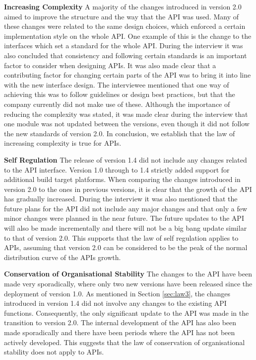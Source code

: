 \documentclass{sig-alternate}
\begin{document}
\smallskip \noindent
\textbf{Increasing Complexity  } \label{sec:law2} 
A majority of the changes introduced in version 2.0 aimed to improve the structure and the way that the API was used. Many of these changes were related to the same design choices, which enforced a certain implementation style on the whole API. One example of this is the change to the interfaces which set a standard for the whole API. During the interview it was also concluded that consistency and following certain standards is an important factor to consider when designing APIs. It was also made clear that a contributing factor for changing certain parts of the API was to bring it into line with the new interface design. The interviewee mentioned that one way of achieving this was to follow guidelines or design best practices, but that the company currently did not make use of these. Although the importance of reducing the complexity was stated, it was made clear during the interview that one module was not updated between the versions, even though it did not follow the new standards of version 2.0. In conclusion, we establish that the law of increasing complexity is true for APIs. 

\smallskip \noindent
\textbf{Self Regulation  } \label{sec:law3} 
The release of version 1.4 did not include any changes related to the API interface. Version 1.0 through to 1.4 strictly added support for additional build target platforms. When comparing the changes introduced in version 2.0 to the ones in previous versions, it is clear that the growth of the API has gradually increased. During the interview it was also mentioned that the future plans for the API did not include any major changes and that only a few minor changes were planned in the near future. The future updates to the API will also be made incrementally and there will not be a big bang update similar to that of version 2.0. This supports that the law of self regulation applies to APIs, assuming that version 2.0 can be considered to be the peak of the normal distribution curve of the APIs growth. 

\smallskip \noindent
\textbf{Conservation of Organisational Stability  } 
The changes to the API have been made very sporadically, where only two new versions have been released since the deployment of version 1.0. As mentioned in Section \ref{sec:law3}, the changes introduced in version 1.4 did not involve any changes to the existing API functions. Consequently, the only significant update to the API was made in the transition to version 2.0. The internal development of the API has also been made sporadically and there have been periods where the API has not been actively developed. This suggests that the law of conservation of organisational stability does not apply to APIs. 
\end{document}
